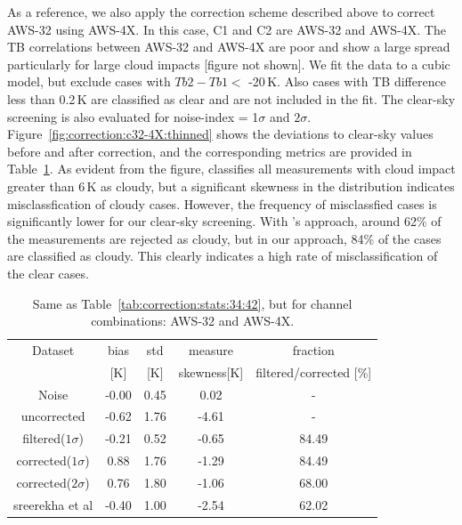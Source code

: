 \documentclass[12pt]{article}
\begin{document}
As a reference, we also apply the correction scheme described above to correct AWS-32 using AWS-4X. In this case, C1 and C2 are AWS-32 and AWS-4X. The TB correlations between AWS-32 and AWS-4X are poor and show a large spread particularly for large cloud impacts [figure not shown]. We fit the data to a cubic model, but exclude cases with $Tb2-Tb1 <$ -20\,K. Also cases with TB difference less than 0.2\,K are classified as clear and are not included in the fit. The clear-sky screening is also  evaluated for noise-index = 1$\sigma$ and $2\sigma$.
Figure~\ref{fig:correction:c32-4X:thinned} shows the deviations to clear-sky values before and after correction, and the corresponding metrics are provided in Table~\ref{tab:correction:stats:32:4X}. As evident from the figure, \cite{rekha2012potential} classifies all measurements with cloud impact greater than 6\,K as cloudy, but a significant skewness in the distribution indicates misclassfication of cloudy cases. However, the frequency of misclassfied cases is significantly lower for our clear-sky screening. With \cite{rekha2012potential}'s approach, around 62\% of the measurements are rejected as cloudy, but in our approach, 84\% of the cases are classified as cloudy. This clearly indicates a high rate of misclassification of the clear cases. 
\begin{table}[!h]
	\centering
	\begin{tabular}[b]{c|c|c|c|c}
		Dataset  		  &   bias &   std &   measure & fraction \\
		&   [K]  &   [K] & skewness[K] 		& filtered/corrected [\%]\\
		\hline
Noise             &  -0.00 &  0.45 &               0.02 &                - \\
uncorrected       &  -0.62 &  1.76 &              -4.61 &                - \\
filtered($1\sigma$)  &  -0.21 &  0.52 &              -0.65 &               84.49 \\
corrected($1\sigma$) &   0.88 &  1.76 &              -1.29 &               84.49 \\
corrected($2\sigma$) &   0.76 &  1.80 &              -1.06 &               68.00 \\
sreerekha et al   &  -0.40 &  1.00 &              -2.54 &               62.02 \\
		\hline
	\end{tabular}
	\caption{Same as Table~\ref{tab:correction:stats:34:42}, but for channel combinations: AWS-32 and AWS-4X.   }
	\label{tab:correction:stats:32:4X}
\end{table}
\end{document}
